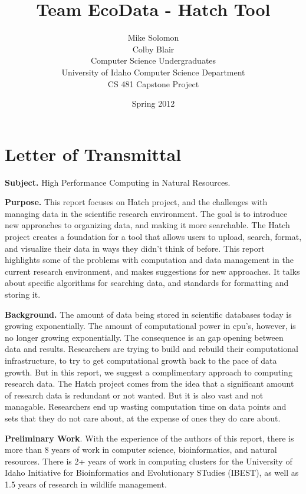 \documentclass[11pt,letterpaper]{article}
\date{Spring 2012}
\title{Team EcoData - Hatch Tool\\
}
\author{Mike Solomon\\
	Colby Blair \\
	Computer Science Undergraduates \\
	University of Idaho Computer Science Department\\
	CS 481 Capstone Project \\
}
\begin{document}
\section*{Letter of Transmittal}
\textbf{Subject.} High Performance Computing in Natural Resources.

\textbf{Purpose.} This report focuses on Hatch project, and the challenges with managing data in the
scientific research environment. The goal is to introduce new approaches to organizing data, and making
it more searchable. The Hatch project creates a foundation for a tool that allows users to upload, search,
format, and visualize their data in ways they didn't think of before. This report highlights some of the 
problems with computation and data management in the current research environment, and makes 
suggestions for new approaches. It talks about specific algorithms for searching data, and standards for
formatting and storing it.

\textbf{Background.} The amount of data being stored in scientific databases today is growing 
exponentially. The amount of computational power in cpu's, however, is no longer growing exponentially.
The consequence is an gap opening between data and results. Researchers are trying to build and rebuild
their computational infrastructure, to try to get computational growth back to the pace of data growth.
But in this report, we suggest a complimentary approach to computing research data. The Hatch project
comes from the idea that a significant amount of research data is redundant or not wanted. But it is also
vast and not managable. Researchers end up wasting computation time on data points and sets that they do 
not care about, at the expense of ones they do care about.

\textbf{Preliminary Work}. With the experience of the authors of this report, there is more than 8 years of work in computer science, bioinformatics, and natural resources. There is 2+ years of work in computing
clusters for the University of Idaho Initiative for Bioinformatics and Evolutionary STudies (IBEST), as well as 
1.5 years of research in wildlife management. 

\thispagestyle{empty}

\pagebreak

\maketitle

\thispagestyle{empty}
\end{document}
